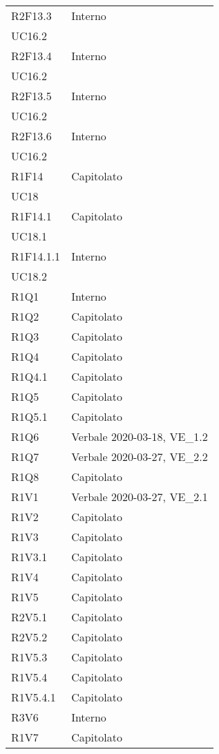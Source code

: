 \begin{longtable}{ 
		>{\centering}p{}
		>{\centering}p{}}
	R2F13.3	& Interno\\	UC16.2 \tabularnewline
	R2F13.4	& Interno\\	UC16.2 \tabularnewline
	R2F13.5	& Interno\\	UC16.2 \tabularnewline
	R2F13.6	& Interno\\	UC16.2 \tabularnewline
	R1F14	& Capitolato\\	UC18 \tabularnewline
	R1F14.1	& Capitolato\\	UC18.1 \tabularnewline
	R1F14.1.1 &	Interno\\	UC18.2 \tabularnewline
	R1Q1& 	Interno	 \tabularnewline
	R1Q2 &	Capitolato	 \tabularnewline
	R1Q3 &	Capitolato	 \tabularnewline
	R1Q4 &	Capitolato	 \tabularnewline
	R1Q4.1 &	Capitolato	\tabularnewline
	R1Q5 &	Capitolato	\tabularnewline
	R1Q5.1	& Capitolato\tabularnewline
	R1Q6 &	Verbale 2020-03-18, VE\_1.2 \tabularnewline 	
	R1Q7& 	Verbale 2020-03-27, VE\_2.2	 \tabularnewline
	R1Q8 &	Capitolato	 \tabularnewline
	R1V1 &	Verbale 2020-03-27, VE\_2.1	 \tabularnewline
	R1V2 &	Capitolato	 \tabularnewline
	R1V3 &	Capitolato	 \tabularnewline
	R1V3.1 &	Capitolato	 \tabularnewline
	R1V4 &	Capitolato	\tabularnewline
	R1V5 &	Capitolato	\tabularnewline
	R2V5.1 &	Capitolato	\tabularnewline
	R2V5.2 &	Capitolato	\tabularnewline
	R1V5.3 &	Capitolato	\tabularnewline
	R1V5.4 &	Capitolato	\tabularnewline
	R1V5.4.1 &	Capitolato	\tabularnewline
	R3V6 &	Interno	\tabularnewline
	R1V7 & Capitolato
	
	
\end{longtable}	
